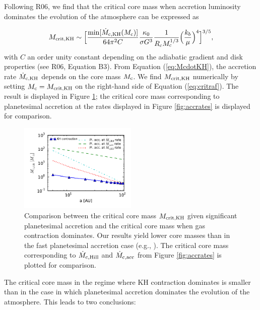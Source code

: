 \documentclass[apj]{emulateapj}
\newcommand{\co}{_{\rm c}}
\begin{document}
Following R06, we find that the critical core mass when accretion luminosity dominates the evolution of the atmosphere can be expressed as

\begin{equation}
\label{eq:critraf}
M_{\rm{crit, KH}} \sim \Big[\frac{\min[\dot{M}_{\rm c, KH}(M_{\rm{c}})]}{64 \pi^2 C} \frac{\kappa_0}{\sigma G^3} \frac{1}{R\co M\co^{1/3}} \Big(\frac{k_b}{\mu}\Big)^4\Big]^{3/5},
\end{equation}
with $C$ an order unity constant depending on the adiabatic gradient and disk properties (see R06, Equation B3). From Equation (\ref{eq:McdotKH}), the accretion rate $\dot{M}_{\rm c, KH}$ depends on the core mass $M\co$. We find $M_{\rm crit, KH}$ numerically by setting $M\co=M_{\rm crit, KH}$ on the right-hand side of Equation (\ref{eq:critraf}). The result is displayed in Figure \ref{fig:raf2}; the critical core mass corresponding to planetesimal accretion at the rates displayed in Figure \ref{fig:accrates} is displayed for comparison.  

 \begin{figure}[h]
\centering
\includegraphics[width=0.5\textwidth]{../../figs/ModelAtmospheres/RadSelfGravRealEOS/PaperFigs/Mc_vs_a_poly_comp.pdf}
\caption{Comparison between the critical core mass $M_{\rm{crit, KH}}$ given significant planetesimal accretion and the critical core mass when gas contraction dominates. Our results yield lower core masses than in the fast planetesimal accretion case (e.g., \citealt{rafikov06}). The critical core mass corresponding to $\dot{M}_{\rm c, Hill}$ and $\dot{M}_{\rm c, acc}$ from Figure \ref{fig:accrates} is plotted for comparison.}
\label{fig:raf2}
\end{figure}

The critical core mass in the regime where KH contraction dominates is smaller than in the case in which planetesimal accretion dominates the evolution of the atmosphere. This leads to two conclusions:
\end{document}
